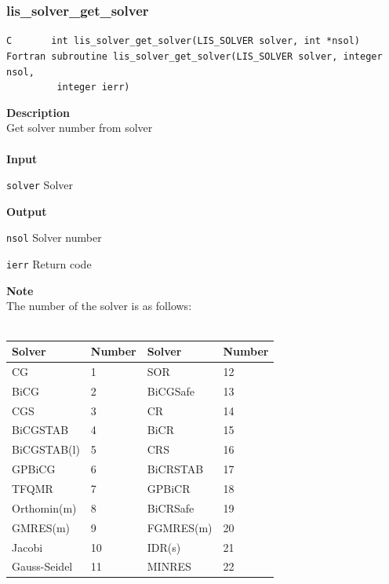 \documentclass[a4paper]{article}
\newcommand{\namelistlabel}[1]{\mbox{#1}\hfill}
\newenvironment{namelist}[1]{%
 \begin{list}{}
  {\let\makelabel\namelistlabel
  \settowidth{\labelwidth}{#1}
  \setlength{\leftmargin}{1.1\labelwidth}}
}{%
\end{list}}
\begin{document}
  \subsubsection{lis\_solver\_get\_solver}
\begin{screen}
\verb|C       int lis_solver_get_solver(LIS_SOLVER solver, int *nsol)|\\
\verb|Fortran subroutine lis_solver_get_solver(LIS_SOLVER solver, integer nsol,|\\
\verb|         integer ierr)|
\end{screen}
{\bf Description}\\
\indent
Get solver number from solver
\\ \\
\noindent
{\bf Input}
\begin{namelist}{XXXXXXXXXXXXXXXXXXXX}
\item[\tt solver] Solver
\end{namelist}
{\bf Output}
\begin{namelist}{XXXXXXXXXXXXXXXXXXXX}
\item[\tt nsol] Solver number
\item[\tt ierr] Return code
\end{namelist}
{\bf Note}\\
\indent
The number of the solver is as follows:\\ \\
\begin{minipage}[t]{\textwidth}
\begin{center}
\begin{tabular}{l|l||l|l}\hline\hline
 Solver      & Number & Solver     & Number \\ \hline
 CG          & 1    & SOR          & 12    \\
 BiCG        & 2    & BiCGSafe     & 13    \\
 CGS         & 3    & CR           & 14    \\
 BiCGSTAB    & 4    & BiCR         & 15    \\
 BiCGSTAB(l) & 5    & CRS          & 16    \\
 GPBiCG      & 6    & BiCRSTAB     & 17    \\
 TFQMR       & 7    & GPBiCR       & 18    \\
 Orthomin(m) & 8    & BiCRSafe     & 19    \\
 GMRES(m)    & 9    & FGMRES(m)    & 20    \\
 Jacobi      & 10   & IDR(s)       & 21    \\
Gauss-Seidel & 11   & MINRES       & 22    \\ 
\hline         
\end{tabular}
\end{center}
\end{minipage}
\end{document}
